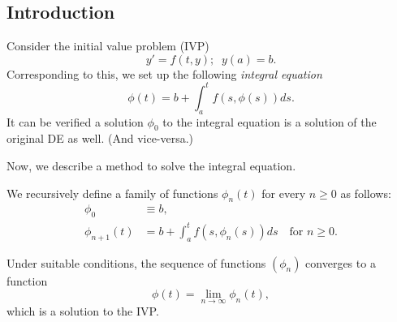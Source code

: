 \subsection{Introduction}
\begin{mdframed}[style=boxstyle, frametitle={The Setup}]
	Consider the initial value problem (IVP)
	\[y' = f(t, y); \;\; y(a) = b.\]
	Corresponding to this, we set up the following \emph{integral equation}
	\[\phi(t) = b + \int_{a}^{t} f(s, \phi(s)) ds.\]
	It can be verified a solution $\phi_0$ to the integral equation is a solution of the original DE as well. (And vice-versa.)\\
\end{mdframed}
Now, we describe a method to solve the integral equation.

\newpage

\begin{mdframed}[style=boxstyle, frametitle={Picard's Iteration Method}]
	We recursively define a family of functions $\phi_n(t)$ for every $n \ge 0$ as follows:
	\begin{align*} 
		\phi_0 &\equiv b,\\
		\phi_{n + 1}(t) &= b + \int_{a}^{t} f(s, \phi_n(s)) ds \quad \text{for }n \ge 0.
	\end{align*}
\end{mdframed}
Under suitable conditions, the sequence of functions $\left(\phi_n\right)$ converges to a function
\[\phi(t) = \lim_{n\to \infty}\phi_n(t),\]
which is a solution to the IVP.

